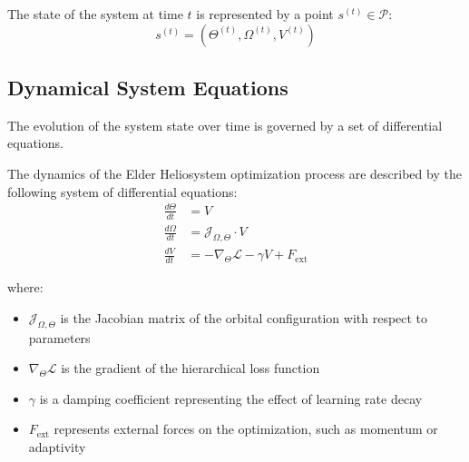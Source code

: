 \begin{definition}
The state of the system at time $t$ is represented by a point $s^{(t)} \in \mathcal{P}$:
\begin{equation}
s^{(t)} = (\Theta^{(t)}, \Omega^{(t)}, V^{(t)})
\end{equation}
\end{definition}

\subsection{Dynamical System Equations}

The evolution of the system state over time is governed by a set of differential equations.

\begin{theorem}
The dynamics of the Elder Heliosystem optimization process are described by the following system of differential equations:
\begin{align}
\frac{d\Theta}{dt} &= V \\
\frac{d\Omega}{dt} &= \mathcal{J}_{\Omega,\Theta} \cdot V \\
\frac{dV}{dt} &= -\nabla_{\Theta} \mathcal{L} - \gamma V + F_{\text{ext}}
\end{align}

where:
\begin{itemize}
    \item $\mathcal{J}_{\Omega,\Theta}$ is the Jacobian matrix of the orbital configuration with respect to parameters
    \item $\nabla_{\Theta} \mathcal{L}$ is the gradient of the hierarchical loss function
    \item $\gamma$ is a damping coefficient representing the effect of learning rate decay
    \item $F_{\text{ext}}$ represents external forces on the optimization, such as momentum or adaptivity
\end{itemize}
\end{theorem}

